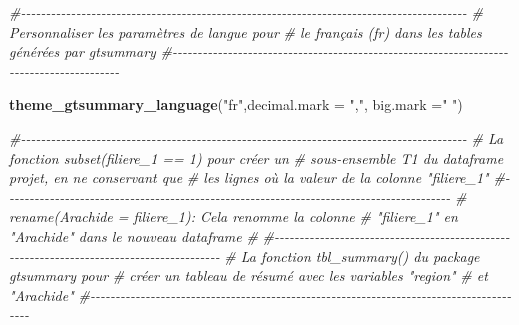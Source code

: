 \documentclass[
]{article}
\newenvironment{Shaded}{\begin{snugshade}}{\end{snugshade}}
\newcommand{\AttributeTok}[1]{\textcolor[rgb]{0.13,0.29,0.53}{#1}}
\newcommand{\CommentTok}[1]{\textcolor[rgb]{0.56,0.35,0.01}{\textit{#1}}}
\newcommand{\FunctionTok}[1]{\textcolor[rgb]{0.13,0.29,0.53}{\textbf{#1}}}
\newcommand{\NormalTok}[1]{#1}
\newcommand{\StringTok}[1]{\textcolor[rgb]{0.31,0.60,0.02}{#1}}
\begin{document}
\begin{Shaded}
\begin{Highlighting}[]
\CommentTok{\#{-}{-}{-}{-}{-}{-}{-}{-}{-}{-}{-}{-}{-}{-}{-}{-}{-}{-}{-}{-}{-}{-}{-}{-}{-}{-}{-}{-}{-}{-}{-}{-}{-}{-}{-}{-}{-}{-}{-}{-}{-}{-}{-}{-}{-}{-}{-}{-}{-}{-}{-}{-}{-}{-}{-}{-}{-}{-}{-}{-}{-}{-}{-}{-}{-}{-}{-}{-}{-}{-}{-}{-}{-}{-}{-}{-}{-}{-}{-}{-}{-}{-}{-}{-}{-}{-}{-}{-}{-}}
\CommentTok{\#         Personnaliser les paramètres de langue pour}
\CommentTok{\#   le français (fr) dans les tables générées par gtsummary}
\CommentTok{\#{-}{-}{-}{-}{-}{-}{-}{-}{-}{-}{-}{-}{-}{-}{-}{-}{-}{-}{-}{-}{-}{-}{-}{-}{-}{-}{-}{-}{-}{-}{-}{-}{-}{-}{-}{-}{-}{-}{-}{-}{-}{-}{-}{-}{-}{-}{-}{-}{-}{-}{-}{-}{-}{-}{-}{-}{-}{-}{-}{-}{-}{-}{-}{-}{-}{-}{-}{-}{-}{-}{-}{-}{-}{-}{-}{-}{-}{-}{-}{-}{-}{-}{-}{-}{-}{-}{-}{-}{-}}


\FunctionTok{theme\_gtsummary\_language}\NormalTok{(}\StringTok{"fr"}\NormalTok{,}\AttributeTok{decimal.mark =} \StringTok{","}\NormalTok{, }\AttributeTok{big.mark =}\StringTok{" "}\NormalTok{)}

\CommentTok{\#{-}{-}{-}{-}{-}{-}{-}{-}{-}{-}{-}{-}{-}{-}{-}{-}{-}{-}{-}{-}{-}{-}{-}{-}{-}{-}{-}{-}{-}{-}{-}{-}{-}{-}{-}{-}{-}{-}{-}{-}{-}{-}{-}{-}{-}{-}{-}{-}{-}{-}{-}{-}{-}{-}{-}{-}{-}{-}{-}{-}{-}{-}{-}{-}{-}{-}{-}{-}{-}{-}{-}{-}{-}{-}{-}{-}{-}{-}{-}{-}{-}{-}{-}{-}{-}{-}{-}{-}{-}}
\CommentTok{\#  La fonction subset(filiere\_1 == 1) pour créer un}
\CommentTok{\# sous{-}ensemble T1 du dataframe projet, en ne conservant que}
\CommentTok{\#     les lignes où la valeur de la colonne "filiere\_1"}
\CommentTok{\#{-}{-}{-}{-}{-}{-}{-}{-}{-}{-}{-}{-}{-}{-}{-}{-}{-}{-}{-}{-}{-}{-}{-}{-}{-}{-}{-}{-}{-}{-}{-}{-}{-}{-}{-}{-}{-}{-}{-}{-}{-}{-}{-}{-}{-}{-}{-}{-}{-}{-}{-}{-}{-}{-}{-}{-}{-}{-}{-}{-}{-}{-}{-}{-}{-}{-}{-}{-}{-}{-}{-}{-}{-}{-}{-}{-}{-}{-}{-}{-}{-}{-}{-}{-}{-}{-}{-}{-}{-}}
\CommentTok{\#   rename(Arachide = filiere\_1): Cela renomme la colonne}
\CommentTok{\#  "filiere\_1" en "Arachide" dans le nouveau dataframe }
\CommentTok{\#}
\CommentTok{\#{-}{-}{-}{-}{-}{-}{-}{-}{-}{-}{-}{-}{-}{-}{-}{-}{-}{-}{-}{-}{-}{-}{-}{-}{-}{-}{-}{-}{-}{-}{-}{-}{-}{-}{-}{-}{-}{-}{-}{-}{-}{-}{-}{-}{-}{-}{-}{-}{-}{-}{-}{-}{-}{-}{-}{-}{-}{-}{-}{-}{-}{-}{-}{-}{-}{-}{-}{-}{-}{-}{-}{-}{-}{-}{-}{-}{-}{-}{-}{-}{-}{-}{-}{-}{-}{-}{-}{-}{-}}
\CommentTok{\#   La fonction tbl\_summary() du package gtsummary pour }
\CommentTok{\#   créer un tableau de résumé avec les variables "region"}
\CommentTok{\#            et "Arachide"}
\CommentTok{\#{-}{-}{-}{-}{-}{-}{-}{-}{-}{-}{-}{-}{-}{-}{-}{-}{-}{-}{-}{-}{-}{-}{-}{-}{-}{-}{-}{-}{-}{-}{-}{-}{-}{-}{-}{-}{-}{-}{-}{-}{-}{-}{-}{-}{-}{-}{-}{-}{-}{-}{-}{-}{-}{-}{-}{-}{-}{-}{-}{-}{-}{-}{-}{-}{-}{-}{-}{-}{-}{-}{-}{-}{-}{-}{-}{-}{-}{-}{-}{-}{-}{-}{-}{-}{-}{-}{-}{-}}






\end{Highlighting}
\end{Shaded}
\end{document}
